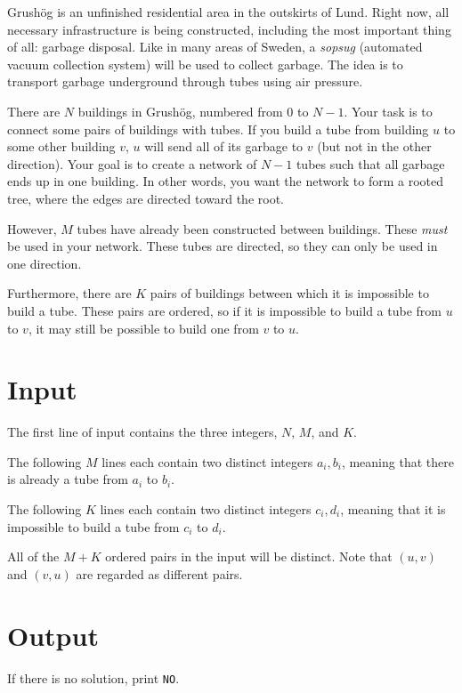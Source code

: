 Grushög is an unfinished residential area in the outskirts of Lund. 
Right now, all necessary infrastructure is being constructed, including the most important
thing of all: garbage disposal. Like in many areas of Sweden, a \textit{sopsug} (automated vacuum collection 
system) will be used to collect garbage. The idea is to transport garbage underground through tubes using air pressure.

There are $N$ buildings in Grushög, numbered from $0$ to $N-1$. Your task is to connect some pairs
of buildings with tubes. If you build a tube from building $u$ to some other
building $v$, $u$ will send all of its garbage to $v$ (but not in the other direction). 
Your goal is to create a network of $N-1$ tubes such that all garbage ends up in one building.
In other words, you want the network to form a rooted tree, where the edges are directed toward the root.

However, $M$ tubes have already been constructed between buildings. These \textit{must} be used in your network. 
These tubes are directed, so they can only be used in one direction.

Furthermore, there are $K$ pairs of buildings between which it is impossible to build a tube. These pairs 
are ordered, so if it is impossible to build a tube from $u$ to $v$, it may still be possible to build
one from $v$ to $u$.

\section*{Input}

The first line of input contains the three integers, $N$, $M$, and $K$.

The following $M$ lines each contain two distinct integers $a_i, b_i$, meaning that 
there is already a tube from $a_i$ to $b_i$.

The following $K$ lines each contain two distinct integers $c_i, d_i$, meaning that 
it is impossible to build a tube from $c_i$ to $d_i$. 

All of the $M+K$ ordered pairs in the input will be distinct. 
Note that $(u,v)$ and $(v,u)$ are regarded as different pairs.

\section*{Output}

If there is no solution, print \texttt{NO}.


